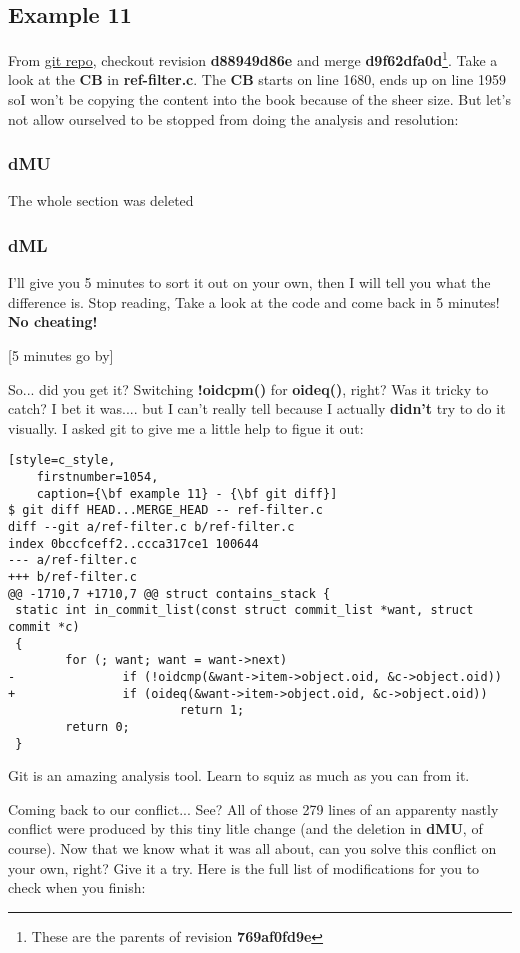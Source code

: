 \subsection{Example 11}

From \hyperref[git_repo]{git repo}, checkout revision {\bf d88949d86e} and merge {\bf d9f62dfa0d}\footnote{These are the parents
of revision {\bf 769af0fd9e}}. Take a look at the {\bf CB} in {\bf ref-filter.c}. The {\bf CB} starts on line 1680, ends up on line
1959 soI won't be copying the content into the book because of the sheer size. But let's not allow ourselved to be stopped from
doing the analysis and resolution:

\subsubsection{dMU}
The whole section was deleted

\subsubsection{dML}
I'll give you 5 minutes to sort it out on your own, then I will tell you what the difference is. Stop reading,
Take a look at the code and come back in 5 minutes! {\bf No cheating!}

[5 minutes go by]

So... did you get it? Switching {\bf !oidcpm()} for {\bf oideq()}, right? Was it tricky to catch? I bet it was.... but I
can't really tell because I actually {\bf didn't} try to do it visually. I asked git to give me a little help to figue it out:

\begin{lstlisting}[style=c_style,
	firstnumber=1054,
	caption={\bf example 11} - {\bf git diff}]
$ git diff HEAD...MERGE_HEAD -- ref-filter.c
diff --git a/ref-filter.c b/ref-filter.c
index 0bccfceff2..ccca317ce1 100644
--- a/ref-filter.c
+++ b/ref-filter.c
@@ -1710,7 +1710,7 @@ struct contains_stack {
 static int in_commit_list(const struct commit_list *want, struct commit *c)
 {
        for (; want; want = want->next)
-               if (!oidcmp(&want->item->object.oid, &c->object.oid))
+               if (oideq(&want->item->object.oid, &c->object.oid))
                        return 1;
        return 0;
 }
\end{lstlisting}
Git is an amazing analysis tool. Learn to squiz as much as you can from it.

Coming back to our conflict... See? All of those 279 lines of an apparenty nastly conflict were produced by this tiny
litle change (and the deletion in {\bf dMU}, of course). Now that we know what it was all about, can you solve this conflict
on your own, right? Give it a try. Here is the full list of modifications for you to check when you finish:

